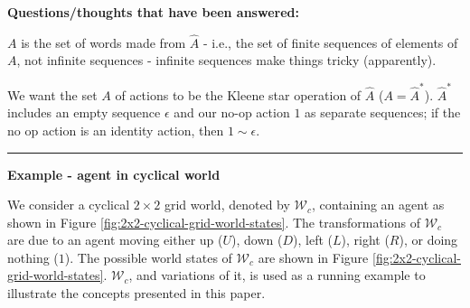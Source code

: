 {\textbf{Questions/thoughts that have been answered:}
\begin{compactitem}
    \item $A$ is the set of words made from $\hat{A}$ - i.e., the set of finite sequences of elements of $A$, not infinite sequences - infinite sequences make things tricky (apparently).

    \item We want the set $A$ of actions to be the Kleene star operation of $\hat{A}$ ($A = \hat{A}^{*}$). $\hat{A}^{*}$ includes an empty sequence $\epsilon$ and our no-op action $1$ as separate sequences; if the no op action is an identity action, then $1 \sim \epsilon$.
\end{compactitem}
}


\noindent\rule{\textwidth}{1mm}
\textbf{Example - agent in cyclical world}

We consider a cyclical $2\times 2$ grid world, denoted by $\mathscr{W}_{c}$, containing an agent as shown in Figure \ref{fig:2x2-cyclical-grid-world-states}.
The transformations of $\mathscr{W}_{c}$ are due to an agent moving either up ($U$), down ($D$), left ($L$), right ($R$), or doing nothing ($1$).
The possible world states of $\mathscr{W}_{c}$ are shown in Figure \ref{fig:2x2-cyclical-grid-world-states}.
$\mathscr{W}_{c}$, and variations of it, is used as a running example to illustrate the concepts presented in this paper.

